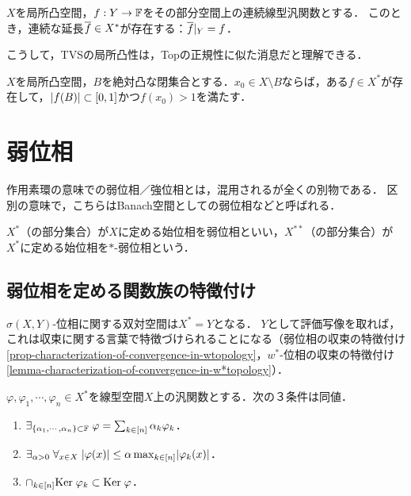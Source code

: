 \documentclass[uplatex,dvipdfmx]{jsreport}
\begin{document}
\begin{corollary}[連続延長定理]
    $X$を局所凸空間，$f:Y\to\mathbb{F}$をその部分空間上の連続線型汎関数とする．
    このとき，連続な延長$\overline{f}\in X^*$が存在する：$\overline{f}|_Y=f$．
\end{corollary}

\begin{remarks}
    こうして，TVSの局所凸性は，Topの正規性に似た消息だと理解できる．
\end{remarks}

\begin{corollary}
    $X$を局所凸空間，$B$を絶対凸な閉集合とする．$x_0\in X\setminus B$ならば，ある$f\in X^*$が存在して，$\lvert f(B)\rvert\subset[0,1]$かつ$f(x_0)>1$を満たす．
\end{corollary}

\section{弱位相}

\begin{tcolorbox}[colframe=ForestGreen, colback=ForestGreen!10!white,breakable,colbacktitle=ForestGreen!40!white,coltitle=black,fonttitle=\bfseries\sffamily,
title=]
    作用素環の意味での弱位相／強位相とは，混用されるが全くの別物である．
    区別の意味で，こちらはBanach空間としての弱位相などと呼ばれる．

    $X^*$（の部分集合）が$X$に定める始位相を弱位相といい，$X^{**}$（の部分集合）が$X^*$に定める始位相を$*$-弱位相という．
\end{tcolorbox}

\subsection{弱位相を定める関数族の特徴付け}

\begin{tcolorbox}[colframe=ForestGreen, colback=ForestGreen!10!white,breakable,colbacktitle=ForestGreen!40!white,coltitle=black,fonttitle=\bfseries\sffamily,
title=]
    $\sigma(X,Y)$-位相に関する双対空間は$X^*=Y$となる．
    $Y$として評価写像を取れば，これは収束に関する言葉で特徴づけられることになる（弱位相の収束の特徴付け\ref{prop-characterization-of-convergence-in-wtopology}，$w^*$-位相の収束の特徴付け\ref{lemma-characterization-of-convergence-in-w*topology}）．
\end{tcolorbox}

\begin{lemma}
    $\varphi,\varphi_1,\cdots,\varphi_n\in X^*$を線型空間$X$上の汎関数とする．次の３条件は同値．
    \begin{enumerate}
        \item $\exists_{\left\{\alpha_1,\cdots,\alpha_n\right\}\subset\mathbb{F}}\;\varphi=\sum_{k\in[n]}\alpha_k\varphi_k$．
        \item $\exists_{\alpha>0}\;\forall_{x\in X}\;\lvert\varphi(x)\rvert\le\alpha\max_{k\in[n]}\lvert\varphi_k(x)\rvert$．
        \item $\cap_{k\in[n]}\mathrm{Ker}\;\varphi_k\subset\mathrm{Ker}\;\varphi$．
    \end{enumerate}
\end{lemma}
\end{document}
